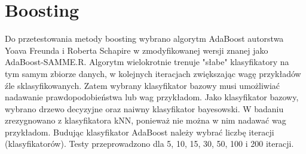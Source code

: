 \section{Boosting}
Do przetestowania metody boosting wybrano algorytm AdaBoost autorstwa Yoava Freunda i Roberta Schapire w zmodyfikowanej wersji znanej jako AdaBoost-SAMME.R. Algorytm wielokrotnie trenuje "słabe" klasyfikatory na tym samym zbiorze danych, w kolejnych iteracjach zwiększając wagę przykładów źle sklasyfikowanych. Zatem wybrany klasyfikator bazowy musi umożliwiać nadawanie prawdopodobieństwa lub wag przykładom. Jako klasyfikator bazowy, wybrano drzewo decyzyjne oraz naiwny klasyfikator bayesowski. W badaniu zrezygnowano z klasyfikatora kNN, ponieważ nie można w nim nadawać wag przykładom. Budując klasyfikator AdaBoost należy wybrać liczbę iteracji (klasyfikatorów). Testy przeprowadzono dla 5, 10, 15, 30, 50, 100 i 200 iteracji.

